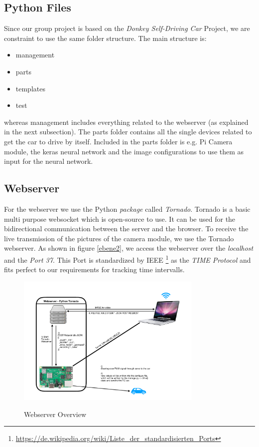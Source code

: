 \documentclass[journal]{IEEEtran}
\begin{document}
\subsection{Python Files}

Since our group project is based on the \textit{Donkey Self-Driving Car} \cite{donkey} Project,  we are constraint to use the same folder structure. The main structure is:

\begin{itemize}
\item management
\item parts
\item templates
\item test
\end{itemize}

whereas management includes everything related to the webserver (as explained in the next subsection). The parts folder contains all the single devices related to get the car to drive by itself. Included in the parts folder is e.g. Pi Camera module, the keras neural network and the image configurations to use them as input for the neural network. 

\subsection{Webserver}

For the webserver we use the Python \textit{package} called \textit{Tornado}. Tornado is a basic multi purpose websocket which is open-source to use. It can be used for the bidirectional communication between the server and the browser. To receive the live transmission of the pictures of the camera module, we use the Tornado webserver. As shown in figure \ref{ebene2}, we access the webserver over the \textit{localhost} and the \textit{Port 37}. This Port is standardized by IEEE \footnote{\url{https://de.wikipedia.org/wiki/Liste_der_standardisierten_Ports}} as the \textit{TIME Protocol} and fits perfect to our requirements for tracking time intervalls.

\begin{figure}
  \begin{center}
  \includegraphics[width=3.5in]{photo/webserver.pdf}\\
  \caption{Webserver Overview}\label{webserver}
  \end{center}
\end{figure}
\end{document}
